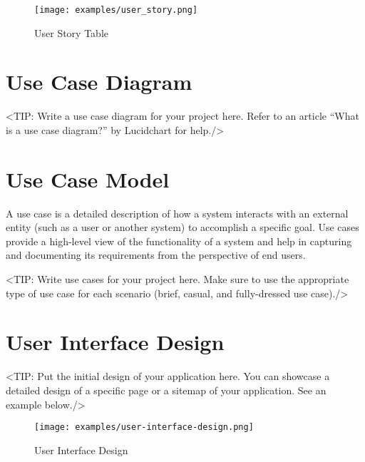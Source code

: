 \begin{figure}[h]
    \centering
    \texttt{[image: examples/user\_story.png]}
    \caption{User Story Table} 
\end{figure}

\section{Use Case Diagram}
\label{section:use-case-diagram}
<TIP: Write a use case diagram for your project here. Refer to an
article “What is a use case diagram?” by Lucidchart for help./>

\section{Use Case Model}
\label{section:use-case-model}
A use case is a detailed description of how a system
interacts with an external entity (such as a user or another system) to
accomplish a specific goal. Use cases provide a high-level view of the
functionality of a system and help in capturing and documenting its
requirements from the perspective of end users.

<TIP: Write use cases for your project here. Make sure to use the
appropriate type of use case for each scenario (brief, casual, and fully-dressed
use case)./>

\section{User Interface Design}
\label{section:user-interface-design}
<TIP: Put the initial design of your application here. You can
showcase a detailed design of a specific page or a sitemap of your application.
See an example below./>

\begin{figure}[h]
    \centering
    \texttt{[image: examples/user-interface-design.png]}
    \caption{User Interface Design}
\end{figure}